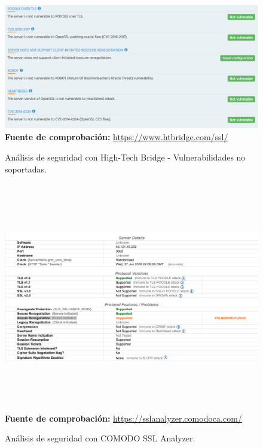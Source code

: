 \documentclass[12pt,a4paper, twoside]{report}
\begin{document}
	\begin{figure}[!ht]   
		\caption{Análisis de seguridad con High-Tech Bridge - Vulnerabilidades no soportadas.} 
		\begin{center} 
	 		\includegraphics[width=15cm,height=5.5cm]{Images/implement/htbridge2} \\
			\label{fig:htbridge2} 
			\textbf{Fuente de comprobación:} \url{https://www.htbridge.com/ssl/}
		\end{center}  
	\end{figure}	
	
	\begin{figure}[!ht]   
		\caption{Análisis de seguridad con COMODO SSL Analyzer.} 
		\begin{center} 
			\includegraphics[width=16cm,height=10cm]{Images/implement/comodo} \\
			\label{fig:comodo} 
			\textbf{Fuente de comprobación:} \url{https://sslanalyzer.comodoca.com/}
		\end{center}  
	\end{figure}	
		
\end{document}
